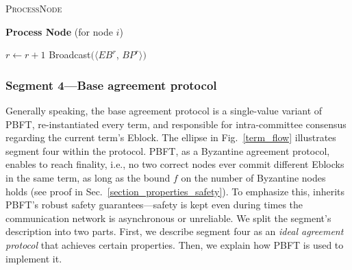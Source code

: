 \begin{algorithm} [htbp] \caption{\label{proc} \textsc{ProcessNode }} 
	\caption*{\textbf{Process Node} (for node $i$)}\label{Process:Node}
	\begin{algorithmic}[1]
    
    	\small

        \Statex {}
        
        \Statex    
        \State {} 
            \Indent
            	
                \State {}
                \State {}
                \State {}
                \State $r \gets r+1$
                \State Broadcast$\big( \langle EB^r$, $BP^r\rangle \big)$
                \State {}
        		\Indent
                	\State {}
				\EndIndent
            \EndIndent       
	\end{algorithmic}
\end{algorithm}


\subsubsection*{Segment 4---Base agreement protocol}
\label{segment4}
Generally speaking, the base agreement protocol is a single-value variant of PBFT, re-instantiated every term, and responsible for intra-committee consensus regarding the current term's Eblock. The ellipse in Fig.~\ref{term_flow} illustrates segment four within the \name protocol. PBFT, as a Byzantine agreement protocol, enables \name to reach finality, i.e., no two correct nodes ever commit different Eblocks in the same term, as long as the bound $f$ on the number of Byzantine nodes holds (see proof in Sec.~\ref{section_properties_safety}). To emphasize this, \name inherits PBFT's robust safety guarantees---safety is kept even during times the communication network is asynchronous or unreliable. We split the segment's description into two parts. First, we describe segment four as an \emph{ideal agreement protocol} that achieves certain properties. Then, we explain how PBFT is used to implement it.  

